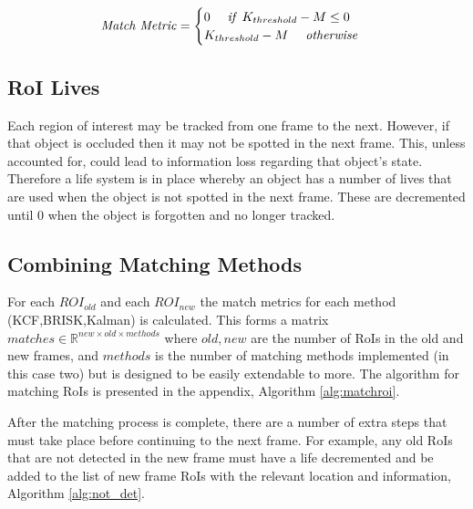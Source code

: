 \documentclass[11pt,twoside]{report}
\begin{document}
\begin{equation}
\begin{aligned}
\textnormal{\textit{Match Metric}} = 
\begin{cases}
0 \quad \textnormal{\textit{ if }} K_{threshold}-M \leq 0 \\
K_{threshold}-M \quad \textnormal{\textit{ otherwise}}
\end{cases}
\end{aligned}
\end{equation}


\subsection{RoI Lives}
Each region of interest may be tracked from one frame to the next. However, if that object is occluded then it may not be spotted in the next frame. This, unless accounted for, could lead to information loss regarding that object's state. Therefore a life system is in place whereby an object has a number of lives that are used when the object is not spotted in the next frame. These are decremented until 0 when the object is forgotten and no longer tracked.  


\subsection{Combining Matching Methods} \label{matching_combining_methods}
For each $ROI_{old}$ and each $ROI_{new}$ the match metrics for each method (KCF,BRISK,Kalman) is calculated. This forms a matrix $matches \in \mathbb{R}^{new \times old \times methods}$ where $old,new$ are the number of RoIs in the old and new frames, and 
$methods$ is the number of matching methods implemented (in this case two) but is designed to be easily extendable to more. The algorithm for matching RoIs is presented in the appendix, Algorithm \ref{alg:matchroi}.
\newline

After the matching process is complete, there are a number of extra steps that must take place before continuing to the next frame. For example, any old RoIs that are not detected in the new frame must have a life decremented and be added to the list of new frame RoIs with the relevant location and information, Algorithm \ref{alg:not_det}. \newline
\end{document}
